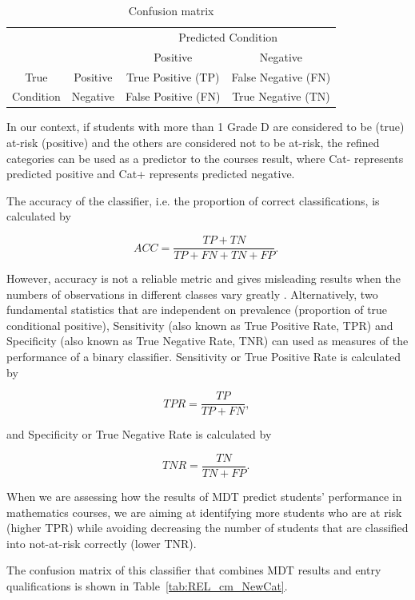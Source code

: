 \documentclass[a4paper]{report}
\begin{document}
\begin{table}[ht]
  \centering
  \begin{tabular}{c|c|c|c}
    \hline
    \multicolumn{2}{c|}{} & \multicolumn{2}{c}{Predicted Condition} \\ 
    \cline{3-4}
    \multicolumn{2}{c|}{} & Positive & Negative \\ 
    \hline
  True & Positive & True Positive (TP) & False Negative (FN) \\ 
    \cline{2-4}
    Condition & Negative & False Positive (FN) & True Negative (TN) \\ 
     \hline
  \end{tabular}
  \caption{\label{tab:cm}Confusion matrix}
\end{table}

In our context, if students with more than 1 Grade D are considered to be (true) at-risk (positive) and the others are considered not to be at-risk, the refined categories can be used as a predictor to the courses result, where Cat- represents predicted positive and Cat+ represents predicted negative. 

The accuracy of the classifier, i.e. the proportion of correct classifications, is calculated by

$$ACC = \frac{TP+TN}{TP+FN+TN+FP} \text{. }$$

\noindent
However, accuracy is not a reliable metric and gives misleading results when the numbers of observations in different classes vary greatly \cite{ACClimit}. Alternatively, two fundamental statistics that are independent on prevalence (proportion of true conditional positive), Sensitivity (also known as True Positive Rate, TPR) and Specificity (also known as True Negative Rate, TNR) can used as measures of the performance of a binary classifier. Sensitivity or True Positive Rate is calculated by 

$$TPR = \frac{TP}{TP+FN} \text{, }$$

\noindent
and Specificity or True Negative Rate is calculated by 

$$TNR = \frac{TN}{TN+FP} \text{. }$$

When we are assessing how the results of MDT predict students' performance in mathematics courses, we are aiming at identifying more students who are at risk (higher TPR) while avoiding decreasing the number of students that are classified into not-at-risk correctly (lower TNR). 

The confusion matrix of this classifier that combines MDT results and entry qualifications is shown in Table~\ref{tab:REL_cm_NewCat}. 
\end{document}
